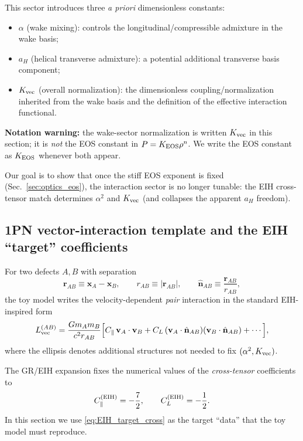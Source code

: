 \documentclass[11pt]{article}
\begin{document}
This sector introduces three \emph{a priori} dimensionless constants:
\begin{itemize}
  \item $\alpha$ (wake mixing): controls the longitudinal/compressible admixture in the wake basis;
  \item $a_H$ (helical transverse admixture): a potential additional transverse basis component;
  \item $K_{\rm vec}$ (overall normalization): the dimensionless coupling/normalization inherited from the wake basis
        and the definition of the effective interaction functional.
\end{itemize}
\noindent
\textbf{Notation warning:} the wake-sector normalization is written $K_{\rm vec}$ in this section; it is \emph{not} the EOS constant in $P=K_{\rm EOS}\rho^n$.
We write the EOS constant as $K_{\rm EOS}$ whenever both appear.

Our goal is to show that once the stiff EOS exponent is fixed (Sec.~\ref{sec:optics_eos}),
the interaction sector is no longer tunable: the EIH cross-tensor match determines
$\alpha^2$ and $K_{\rm vec}$ (and collapses the apparent $a_H$ freedom).

\subsection{1PN vector-interaction template and the EIH ``target'' coefficients}
\label{sec:1pn-interaction-template}

For two defects $A,B$ with separation
\begin{equation}
  \mathbf r_{AB}\equiv \mathbf x_A-\mathbf x_B,\qquad
  r_{AB}\equiv |\mathbf r_{AB}|,\qquad
  \hat{\mathbf n}_{AB}\equiv \frac{\mathbf r_{AB}}{r_{AB}},
\end{equation}
the toy model writes the velocity-dependent \emph{pair} interaction in the standard EIH-inspired form
\begin{equation}
  L_{\rm vec}^{(AB)}
  =\frac{G m_A m_B}{c^2 r_{AB}}
  \Big[
    C_\parallel\,\mathbf v_A\cdot\mathbf v_B
    + C_L\,(\mathbf v_A\cdot \hat{\mathbf n}_{AB})(\mathbf v_B\cdot \hat{\mathbf n}_{AB})
    + \cdots
  \Big],
  \label{eq:Lvec_template}
\end{equation}
where the ellipsis denotes additional structures not needed to fix $(\alpha^2,K_{\rm vec})$.

The GR/EIH expansion fixes the numerical values of the \emph{cross-tensor} coefficients to
\begin{equation}
  C_\parallel^{\rm(EIH)}=-\frac{7}{2},\qquad
  C_L^{\rm(EIH)}=-\frac{1}{2}.
  \label{eq:EIH_target_cross}
\end{equation}
In this section we use \eqref{eq:EIH_target_cross} as the target ``data'' that the toy model must reproduce.
\end{document}

